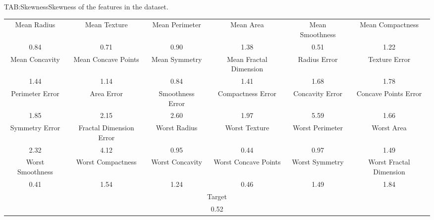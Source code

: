 \begin{table}[Skewness of the features in the dataset]{TAB:Skewness}{Skewness of the features in the dataset.}
    \begin{adjustbox}{width=1\linewidth}

        \small
        \begin{tabular}{|c|c|c|c|c|c|}

            \hline
            Mean Radius      & Mean Texture            & Mean Perimeter   & Mean Area              & Mean Smoothness & Mean Compactness        \\

            0.84             & 0.71                    & 0.90             & 1.38                   & 0.51            & 1.22                    \\
            \hline
            Mean Concavity   & Mean Concave Points     & Mean Symmetry    & Mean Fractal Dimension & Radius Error    & Texture Error           \\
            1.44             & 1.14                    & 0.84             & 1.41                   & 1.68            & 1.78                    \\
            \hline
            Perimeter Error  & Area Error              & Smoothness Error & Compactness Error      & Concavity Error & Concave Points Error    \\
            1.85             & 2.15                    & 2.60             & 1.97                   & 5.59            & 1.66                    \\
            \hline
            Symmetry Error   & Fractal Dimension Error & Worst Radius     & Worst Texture          & Worst Perimeter & Worst Area              \\
            2.32             & 4.12                    & 0.95             & 0.44                   & 0.97            & 1.49                    \\
            \hline
            Worst Smoothness & Worst Compactness       & Worst Concavity  & Worst Concave Points   & Worst Symmetry  & Worst Fractal Dimension \\
            0.41             & 1.54                    & 1.24             & 0.46                   & 1.49            & 1.84                    \\
            \hline
            \hline

            \multicolumn{6}{|c|}{Target} \\
            \multicolumn{6}{|c|}{0.52} \\
            \hline
        \end{tabular}
    \end{adjustbox}

\end{table}

